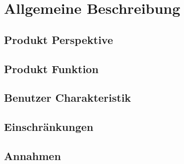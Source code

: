 \chapter{Allgemeine Beschreibung}

\section{Produkt Perspektive}


\section{Produkt Funktion}


\section{Benutzer Charakteristik}


\section{Einschränkungen}


\section{Annahmen}

